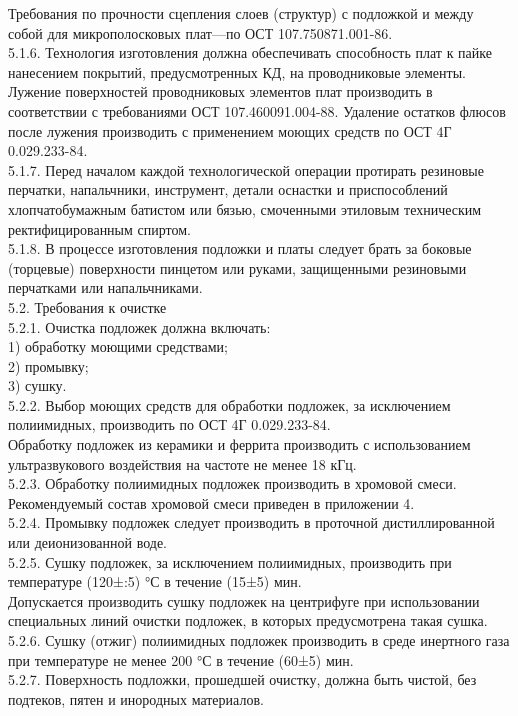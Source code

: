 \documentclass{bmstu}
\begin{document}
	Требования по прочности сцепления слоев (структур) с подложкой и между собой для микрополосковых плат—по ОСТ 107.750871.001-86.  \\
	5.1.6. Технология изготовления должна обеспечивать способность плат к пайке нанесением покрытий, предусмотренных КД, на проводниковые элементы. Лужение поверхностей проводниковых элементов плат производить в соответствии с требованиями ОСТ 107.460091.004-88. Удаление остатков флюсов после лужения производить с применением моющих средств по ОСТ 4Г 0.029.233-84.   \\   
	5.1.7. Перед началом каждой технологической операции протирать резиновые перчатки, напальчники, инструмент, детали оснастки и приспособлений хлопчатобумажным батистом или бязью, смоченными этиловым техническим ректифицированным спиртом. \\
	5.1.8. В процессе изготовления подложки и платы следует брать за боковые (торцевые) поверхности пинцетом или руками, защищенными резиновыми перчатками или напальчниками. \\
	5.2. Требования к очистке \\
	5.2.1. Очистка подложек должна включать: \\
	1) обработку моющими средствами; \\
	2) промывку; \\
	3) сушку. \\
	5.2.2. Выбор моющих средств для обработки подложек, за исключением полиимидных, производить по ОСТ 4Г 0.029.233-84. \\
	Обработку подложек из керамики и феррита производить с использованием ультразвукового воздействия на  частоте не менее 18 кГц. \\
	5.2.3. Обработку полиимидных подложек производить в хромовой смеси. Рекомендуемый состав хромовой смеси приведен в приложении 4. \\
	5.2.4. Промывку подложек следует производить в проточной дистиллированной или деионизованной воде. \\
	5.2.5. Сушку подложек, за  исключением  полиимидных, производить при температуре (120±:5) °С в течение (15±5) мин. \\
	Допускается производить сушку подложек на центрифуге при использовании специальных линий очистки подложек, в которых предусмотрена такая сушка. \\
	5.2.6. Сушку (отжиг) полиимидных подложек производить в среде инертного газа при температуре не менее 200 °С в течение (60±5) мин. \\
	5.2.7. Поверхность подложки, прошедшей очистку, должна быть чистой, без подтеков, пятен и инородных материалов. \\
\end{document}
